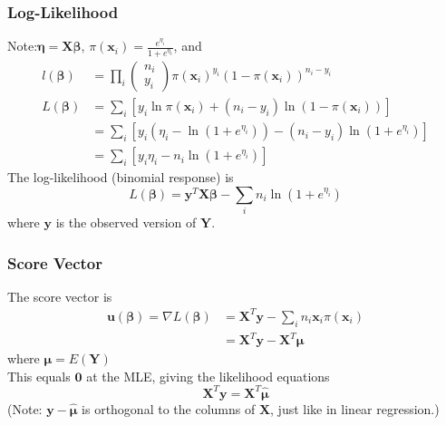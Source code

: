 \documentclass[11pt]{elegantbook}
\begin{document}
\subsubsection*{Log-Likelihood}
Note:$\boldsymbol{\eta}=\boldsymbol{X} \boldsymbol{\beta}$, $\pi\left(\boldsymbol{x}_i\right)=\frac{e^{\eta_i}}{1+e^{\eta_i}}$, and
\begin{equation}
    \begin{aligned}
        l(\boldsymbol{\beta})&=\prod_{i}\begin{pmatrix}
            n_i\\
            y_i
        \end{pmatrix} \pi\left(\boldsymbol{x}_i\right)^{y_i} (1-\pi\left(\boldsymbol{x}_i\right))^{n_i-y_i}\\
        L(\boldsymbol{\beta})&=\sum_{i}\left[ y_i\ln\pi\left(\boldsymbol{x}_i\right)+(n_i-y_i)\ln(1-\pi\left(\boldsymbol{x}_i\right))\right]\\
        &=\sum_{i}\left[ y_i(\eta_i-\ln\left(1+e^{\eta_i}\right))-(n_i-y_i)\ln\left(1+e^{\eta_i}\right)\right]\\
        &=\sum_{i}\left[y_i\eta_i-n_i\ln\left(1+e^{\eta_i}\right)\right]
    \end{aligned}
    \nonumber
\end{equation}
The log-likelihood (binomial response) is
$$
L(\boldsymbol{\beta})=\boldsymbol{y}^T \boldsymbol{X} \boldsymbol{\beta}-\sum_i n_i \ln \left(1+e^{\eta_i}\right)
$$
where $\boldsymbol{y}$ is the observed version of $\boldsymbol{Y}$.

\subsubsection*{Score Vector}
The score vector is
$$
\begin{aligned}
\boldsymbol{u}(\boldsymbol{\beta})=\nabla L(\boldsymbol{\beta}) & =\boldsymbol{X}^T \boldsymbol{y}-\sum_i n_i \boldsymbol{x}_i \pi\left(\boldsymbol{x}_i\right) \\
& =\boldsymbol{X}^T \boldsymbol{y}-\boldsymbol{X}^T \boldsymbol{\mu}
\end{aligned}
$$
where $\boldsymbol{\mu}=E(\boldsymbol{Y})$\\
This equals $\mathbf{0}$ at the MLE, giving the likelihood equations
$$
\boldsymbol{X}^T \boldsymbol{y}=\boldsymbol{X}^T \hat{\boldsymbol{\mu}}
$$
(Note: $\boldsymbol{y}-\hat{\boldsymbol{\mu}}$ is orthogonal to the columns of $\boldsymbol{X}$, just like in linear regression.)
\end{document}
